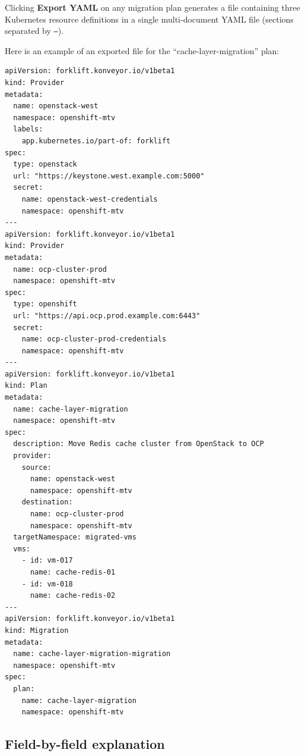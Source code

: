 \documentclass[12pt,a4paper]{article}
\begin{document}
Clicking \textbf{Export YAML} on any migration plan generates a file containing three Kubernetes resource definitions in a single multi-document YAML file (sections separated by \texttt{---}).

Here is an example of an exported file for the ``cache-layer-migration'' plan:

\begin{lstlisting}[language={}]
apiVersion: forklift.konveyor.io/v1beta1
kind: Provider
metadata:
  name: openstack-west
  namespace: openshift-mtv
  labels:
    app.kubernetes.io/part-of: forklift
spec:
  type: openstack
  url: "https://keystone.west.example.com:5000"
  secret:
    name: openstack-west-credentials
    namespace: openshift-mtv
---
apiVersion: forklift.konveyor.io/v1beta1
kind: Provider
metadata:
  name: ocp-cluster-prod
  namespace: openshift-mtv
spec:
  type: openshift
  url: "https://api.ocp.prod.example.com:6443"
  secret:
    name: ocp-cluster-prod-credentials
    namespace: openshift-mtv
---
apiVersion: forklift.konveyor.io/v1beta1
kind: Plan
metadata:
  name: cache-layer-migration
  namespace: openshift-mtv
spec:
  description: Move Redis cache cluster from OpenStack to OCP
  provider:
    source:
      name: openstack-west
      namespace: openshift-mtv
    destination:
      name: ocp-cluster-prod
      namespace: openshift-mtv
  targetNamespace: migrated-vms
  vms:
    - id: vm-017
      name: cache-redis-01
    - id: vm-018
      name: cache-redis-02
---
apiVersion: forklift.konveyor.io/v1beta1
kind: Migration
metadata:
  name: cache-layer-migration-migration
  namespace: openshift-mtv
spec:
  plan:
    name: cache-layer-migration
    namespace: openshift-mtv
\end{lstlisting}

\subsection{Field-by-field explanation}
\end{document}
